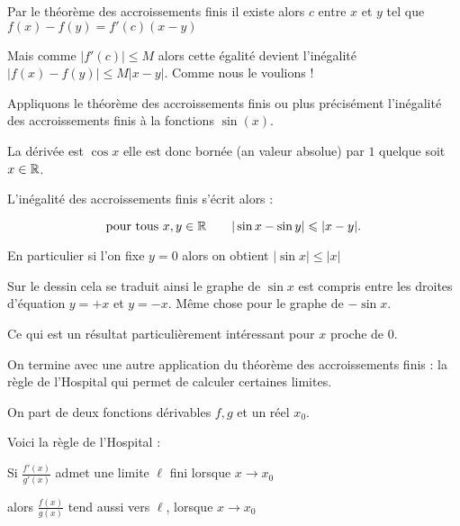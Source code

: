 \change

Par le théorème des accroissements finis 
il existe alors $c$ entre $x$ et $y$ tel que $f(x)-f(y)=f'(c)(x-y)$ 

\change

Mais comme $|f'(c)| \le M$ alors cette égalité devient l'inégalité 
$\big| f(x)-f(y) \big| \le M |x-y|$. Comme nous le voulions !



\diapo

Appliquons le théorème des accroissements finis ou plus précisément l'inégalité des accroissements finis
à la fonctions $\sin(x)$. 


\change

La dérivée est $\cos x$ elle est donc bornée (an valeur absolue) par $1$ quelque soit $x\in \mathbb{R}$.

\change

L'inégalité des accroissements finis s'écrit alors :

\change

$$\text{pour tous } x,y \in \mathbb{R} \qquad |\sin x - \sin y | \leqslant |x-y|.$$

\change

En particulier si l'on fixe $y=0$ alors
on obtient 
$|\sin x| \le |x|$

\change



Sur le dessin cela se traduit ainsi le graphe de $\sin x$ est compris entre les droites 
d'équation $y=+x$ et $y=-x$. Même chose pour le graphe de $-\sin x$.

Ce qui est un résultat particulièrement intéressant pour $x$ proche de $0$.


\diapo

On termine avec une autre application du théorème des accroissements finis : 
la règle de l'Hospital
qui permet de calculer certaines limites.

On part de deux fonctions dérivables
 $f,g$  et  un réel $x_0$.
 
\change

Voici la règle de l'Hospital :

Si  $\frac{f'(x)}{g'(x)}$ admet une limite $\ell$ fini lorsque $x\to x_0$

alors $\frac{f(x)}{g(x)}$ tend aussi vers $\ell$, lorsque $x\to x_0$


\change

